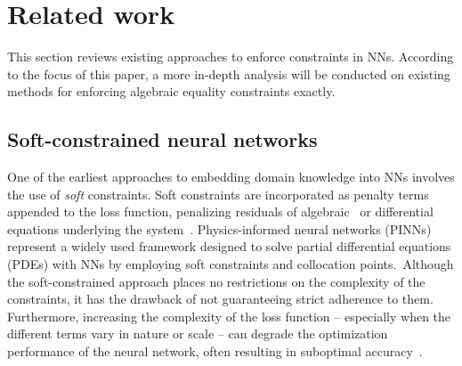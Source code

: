 \section{Related work}
\label{sec:related-work}
This section reviews existing approaches to enforce constraints in NNs. According to the focus of this paper, a more in-depth analysis will be conducted on existing methods for enforcing algebraic equality constraints exactly.

\subsection{Soft-constrained neural networks}
One of the earliest approaches to embedding domain knowledge into NNs involves the use of \textit{soft} constraints. Soft constraints are incorporated as penalty terms appended to the loss function, penalizing residuals of algebraic~\cite{Erichson2019_PhysicsinformedAutoencoders, Pfrommer2020_ContactNetsLearningDiscontinuousa} or differential equations underlying the system~\cite{ Wang2021_Learningsolutionoperator}. Physics-informed neural networks (PINNs)~\cite{Raissi2019_Physicsinformedneural} represent a widely used framework designed to solve partial differential equations (PDEs) with NNs by employing soft constraints and collocation points.\ Although the soft-constrained approach places no restrictions on the complexity of the constraints, it has the drawback of not guaranteeing strict adherence to them. Furthermore, increasing the complexity of the loss function -- especially when the different terms vary in nature or scale -- can degrade the optimization performance of the neural network, often resulting in suboptimal accuracy~\cite{Wang2020_Understandingmitigatinggradient, Wang2020_WhenwhyPINNs}.

